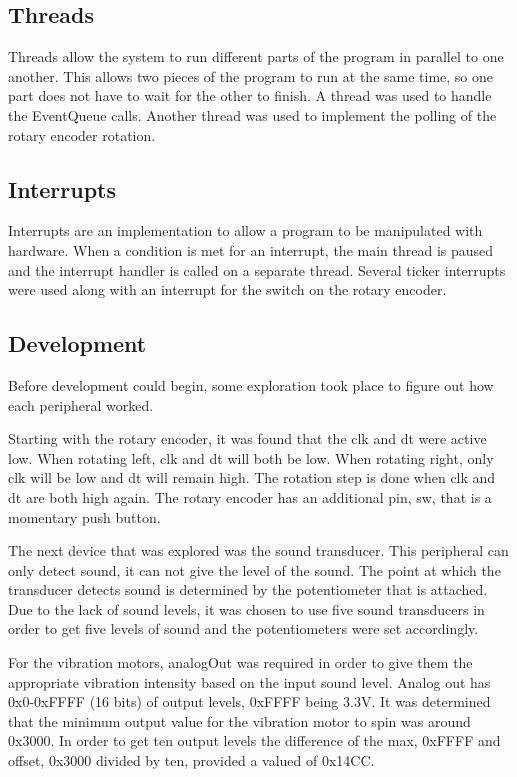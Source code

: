 \documentclass{article}
\begin{document}
\subsection{Threads}
Threads allow the system to run different parts of the program in parallel to one another. This allows two pieces of the program to run at the same time, so one part does not have to wait for the other to finish. A thread was used to handle the EventQueue calls. Another thread was used to implement the polling of the rotary encoder rotation.

\subsection{Interrupts}
Interrupts are an implementation to allow a program to be manipulated with hardware.
When a condition is met for an interrupt, the main thread is paused and the interrupt handler is called on a separate thread.
Several ticker interrupts were used along with an interrupt for the switch on the rotary encoder.

\subsection{Development}
Before development could begin, some exploration took place to figure out how each peripheral worked.  

Starting with the rotary encoder, it was found that the clk and dt were active low.  When rotating left, clk and dt will both be low.  When rotating right, only clk will be low and dt will remain high.  The rotation step is done when clk and dt are both high again.  The rotary encoder has an additional pin, sw, that is a momentary push button.

The next device that was explored was the sound transducer.  This peripheral can only detect sound, it can not give the level of the sound.  The point at which the transducer detects sound is determined by the potentiometer that is attached.  Due to the lack of sound levels, it was chosen to use five sound transducers in order to get five levels of sound and the potentiometers were set accordingly.

For the vibration motors, analogOut was required in order to give them the appropriate vibration intensity based on the input sound level.  Analog out has 0x0-0xFFFF (16 bits) of output levels, 0xFFFF being 3.3V.  It was determined that the minimum output value for the vibration motor to spin was around 0x3000. In order to get ten output levels the difference of the max, 0xFFFF and offset, 0x3000 divided by ten, provided a valued of 0x14CC.
\end{document}
